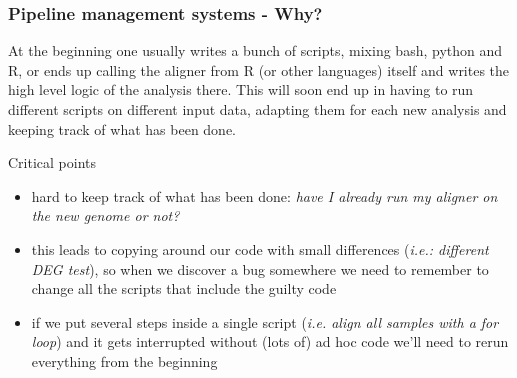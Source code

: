 \documentclass[xcolor=table]{beamer}
\begin{document}
\begin{frame}
\frametitle{Pipeline management systems - Why?}
\begin{tiny}
At the beginning one usually writes a bunch of scripts, mixing bash, python and R, or ends up calling the aligner from R (or other languages) itself and
writes the high level logic of the analysis there.
This will soon end up in having to run different scripts on different input data, adapting them for each new analysis and keeping track of what has been done.
\end{tiny}

\begin{footnotesize}
\begin{beamerboxesrounded}[upper=upper_box2,lower=lower_box,shadow=true]{Critical points}
\begin{itemize}
\item hard to keep track of what has been done: \emph{have I already run my aligner on the new genome or not?}
\item this leads to copying around our code with small differences (\emph{i.e.: different DEG test}), so when we discover a \textcolor{novak}{bug} somewhere we need to remember to change all the scripts that include the guilty code
\item if we put several steps inside a single script (\emph{i.e. align all samples with a for loop}) and it gets interrupted without (lots of) ad hoc code we'll need to rerun everything from the beginning
\end{itemize}
\end{beamerboxesrounded}
\end{footnotesize}
\end{frame}
\end{document}
